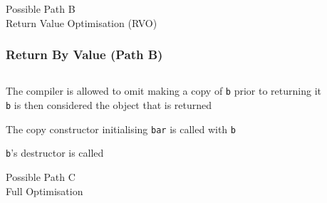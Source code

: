 \begin{frame}
  \begin{center} \Huge
    Possible Path B \\[4mm]
    Return Value Optimisation (RVO)
  \end{center}
\end{frame}

\begin{frame}
  \frametitle{Return By Value (Path B)}
  \begin{center}
    \begin{columns}
      \column{4cm}
      \column{4cm}
    \end{columns}
  \end{center}
  \vskip2mm
  \begin{overprint}
    \begin{center}
      The compiler is allowed to omit making a copy of {\tt b} prior to returning it \\
      {\tt b} is then considered the object that is returned
    \end{center}

    \begin{center}
      The copy constructor initialising {\tt bar} is called with {\tt b}
    \end{center}

    \begin{center}
      {\tt b}'s destructor is called
    \end{center}
  \end{overprint}
\end{frame}

\begin{frame}
  \begin{center} \Huge
    Possible Path C \\[4mm]
    Full Optimisation
  \end{center}
\end{frame}

